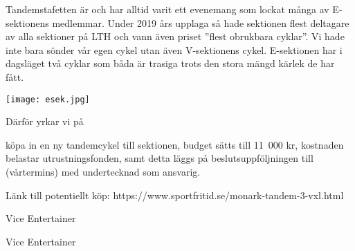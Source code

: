\documentclass[../_main/handlingar.tex]{subfiles}
\begin{document}

Tandemstafetten är och har alltid varit ett evenemang som lockat många av E-sektionens
medlemmar. Under 2019 års upplaga så hade sektionen flest deltagare av alla sektioner på
LTH och vann även priset ”flest obrukbara cyklar”. Vi hade inte bara sönder vår egen cykel
utan även V-sektionens cykel. E-sektionen har i dagsläget två cyklar som båda är trasiga trots
den stora mängd kärlek de har fått.

\begin{center}
    \texttt{[image: esek.jpg]}
\end{center}

Därför yrkar vi på
\begin{attsatser}
    \att köpa in en ny tandemcykel till sektionen,
    \att budget sätts till 11 000 kr,
    \att kostnaden belastar utrustningsfonden, samt
    \att detta läggs på beslutsuppföljningen till (vårtermins) med undertecknad som ansvarig.
\end{attsatser}

Länk till potentiellt köp: https://www.sportfritid.se/monark-tandem-3-vxl.html

\begin{signatures}{2}
    \mvh
    \signature{Simon Mahdavi}{Vice Entertainer}
    \signature{Casper Schwerin}{Vice Entertainer}
\end{signatures}
\end{document}
